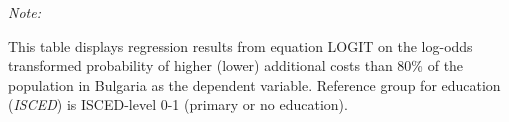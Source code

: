 \begin{table}[htbp!]
\begin{adjustbox}{width = 1\textwidth, max height = 0.95\textheight, center}
\begin{threeparttable}[b]
         \begin{tablenotes}\item \medskip \textit{Note:}
            \item This table displays regression results from equation LOGIT on the log-odds transformed probability of higher (lower) additional costs than 80\% of the population in Bulgaria as the dependent variable. Reference group for education (\textit{ISCED}) is ISCED-level 0-1 (primary or no education).
         \end{tablenotes}
      \end{threeparttable}
   \end{adjustbox}
\end{table}


